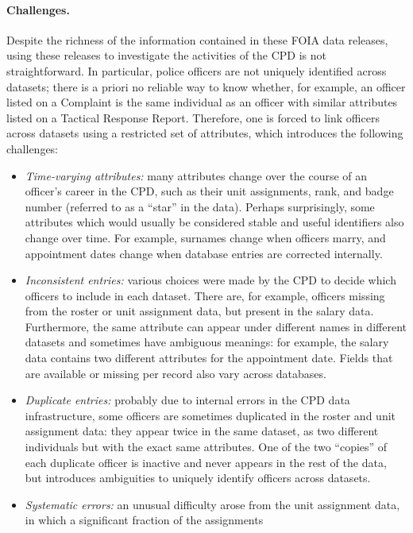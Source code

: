 \paragraph{Challenges.}
Despite the richness of the information contained in these FOIA data releases,
using these releases to investigate  the activities of the CPD is not straightforward. 
In particular, police officers are not uniquely identified across datasets; there is
a priori no reliable way to know whether, for example, an officer listed on
a Complaint is the same individual as an officer with similar attributes listed
on a Tactical Response Report. Therefore, one is forced to link officers
across datasets using a restricted set of attributes, 
which introduces the following challenges:
\begin{itemize}
	\item \emph{Time-varying attributes:} many attributes change over the
		course of an officer's career in the CPD, such as their unit
		assignments, rank, and badge number (referred to as a ``star'' in the data). 
                Perhaps surprisingly, some
		attributes which would usually be considered stable and useful
		identifiers also change over time. For example, surnames change when
		officers marry, and appointment dates change when database entries are
		corrected internally.
	\item \emph{Inconsistent entries:} various choices were made by the CPD to
		decide which officers to include in each dataset.  There are, for
		example, officers missing from the roster or unit assignment data, but
		present in the salary data. Furthermore, the same attribute can appear
		under different names in different datasets and sometimes have
		ambiguous meanings: for example, the salary data contains two different
		attributes for the appointment date. Fields that are available or missing
		per record also vary across databases.
	\item \emph{Duplicate entries:} probably due to internal errors in the CPD
		data infrastructure, some officers are sometimes duplicated in the
		roster and unit assignment data: they appear twice in the same dataset,
		as two different individuals but with the exact same attributes. One of
		the two “copies” of each duplicate officer is inactive and never
		appears in the rest of the data, but introduces ambiguities to uniquely
		identify officers across datasets.
	\item \emph{Systematic errors:} an unusual difficulty arose from the unit
		assignment data, in which a significant fraction of the assignments

\end{itemize}
